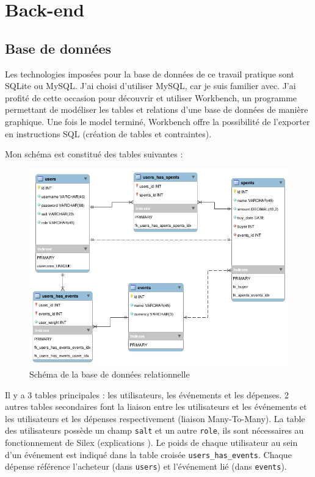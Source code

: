 \documentclass[a4paper, 11pt]{article}
\begin{document}
\section{Back-end}
\subsection{Base de données}
Les technologies imposées pour la base de données de ce travail pratique sont SQLite ou MySQL. J'ai choisi d'utiliser 
MySQL, car je suis familier avec. J'ai profité de cette occasion pour découvrir et utiliser Workbench, un programme 
permettant de modéliser les tables et relations d'une base de données de manière graphique. Une fois le model terminé, 
Workbench offre la possibilité de l'exporter en instructions SQL (création de tables et contraintes).
\bigbreak

Mon schéma est constitué des tables suivantes :
\begin{figure}
	\begin{center}
		\includegraphics[width=1.0\textwidth]{schema.png}
	\end{center}
	\caption{Schéma de la base de données relationnelle}
\end{figure}
Il y a 3 tables principales : les utilisateurs, les événements et les dépenses. 2 autres tables secondaires 
font la liaison entre les utilisateurs et les événements et les utilisateurs et les dépenses respectivement 
(liaison Many-To-Many). La table des utilisateurs possède un champ \texttt{salt} et un autre 
\texttt{role}, ils sont nécessaires au fonctionnement de Silex (explications ). Le poids de chaque 
utilisateur au sein d'un événement est indiqué dans la table croisée \texttt{users_has_events}. 
Chaque dépense référence l'acheteur (dans \texttt{users}) et l'événement lié (dans \texttt{events}).
\end{document}
